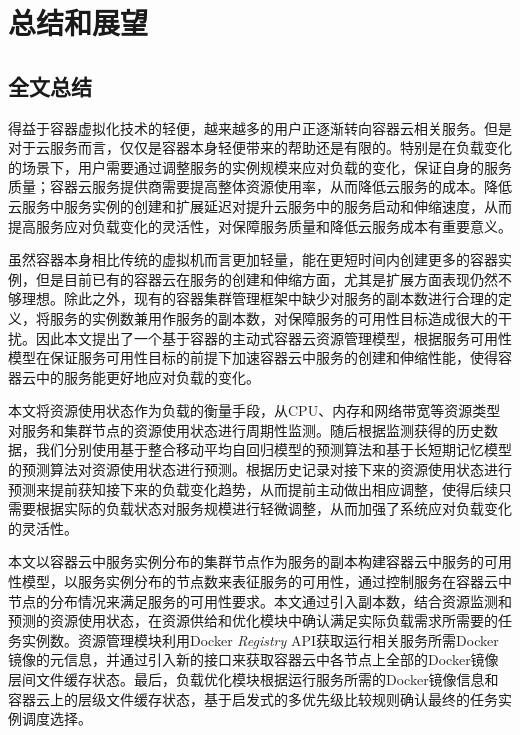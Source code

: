 \chapter{总结和展望}\label{chap:summary}
\section{全文总结}
得益于容器虚拟化技术的轻便，越来越多的用户正逐渐转向容器云相关服务。但是对于云服务而言，仅仅是容器本身轻便带来的帮助还是有限的。特别是在负载变化的场景下，用户需要通过调整服务的实例规模来应对负载的变化，保证自身的服务质量；容器云服务提供商需要提高整体资源使用率，从而降低云服务的成本。降低云服务中服务实例的创建和扩展延迟对提升云服务中的服务启动和伸缩速度，从而提高服务应对负载变化的灵活性，对保障服务质量和降低云服务成本有重要意义。

虽然容器本身相比传统的虚拟机而言更加轻量，能在更短时间内创建更多的容器实例，但是目前已有的容器云在服务的创建和伸缩方面，尤其是扩展方面表现仍然不够理想。除此之外，现有的容器集群管理框架中缺少对服务的副本数进行合理的定义，将服务的实例数兼用作服务的副本数，对保障服务的可用性目标造成很大的干扰。因此本文提出了一个基于容器的主动式容器云资源管理模型，根据服务可用性模型在保证服务可用性目标的前提下加速容器云中服务的创建和伸缩性能，使得容器云中的服务能更好地应对负载的变化。

本文将资源使用状态作为负载的衡量手段，从CPU、内存和网络带宽等资源类型对服务和集群节点的资源使用状态进行周期性监测。随后根据监测获得的历史数据，我们分别使用基于整合移动平均自回归模型的预测算法和基于长短期记忆模型的预测算法对资源使用状态进行预测。根据历史记录对接下来的资源使用状态进行预测来提前获知接下来的负载变化趋势，从而提前主动做出相应调整，使得后续只需要根据实际的负载状态对服务规模进行轻微调整，从而加强了系统应对负载变化的灵活性。

本文以容器云中服务实例分布的集群节点作为服务的副本构建容器云中服务的可用性模型，以服务实例分布的节点数来表征服务的可用性，通过控制服务在容器云中节点的分布情况来满足服务的可用性要求。本文通过引入副本数，结合资源监测和预测的资源使用状态，在资源供给和优化模块中确认满足实际负载需求所需要的任务实例数。资源管理模块利用Docker \emph{Registry} API获取运行相关服务所需Docker镜像的元信息，并通过引入新的接口来获取容器云中各节点上全部的Docker镜像层间文件缓存状态。最后，负载优化模块根据运行服务所需的Docker镜像信息和容器云上的层级文件缓存状态，基于启发式的多优先级比较规则确认最终的任务实例调度选择。

